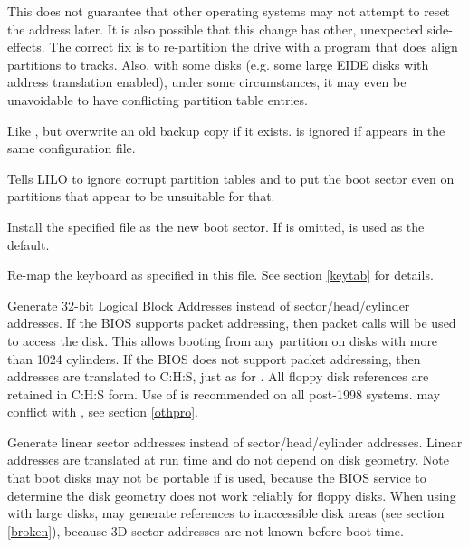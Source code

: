 \begin{description}
     This does not guarantee that other operating systems
    may not attempt to reset the address later. It is also possible that this
    change has other, unexpected side-effects. The correct fix is to
    re-partition the drive with a program that does align partitions to tracks.
    Also, with some disks (e.g. some large EIDE disks with address
    translation enabled), under some circumstances, it may even be unavoidable
    to have conflicting partition table entries.
  \item[\craw{force-backup=}\meta{backup\_file}] Like , but
    overwrite an old backup copy if it exists.
    is ignored if  appears in the same configuration file.
  \item[\craw{ignore-table}] Tells LILO to ignore corrupt partition tables and
    to put the boot sector even on partitions that appear to be unsuitable for
    that.
  \item[\craw{install=}\meta{boot\_sector}] Install the specified file as the
    new boot sector. If  is omitted,  is used
    as the default.
  \item[\craw{keytable=}\meta{table\_file}] Re-map the keyboard as specified
    in this file. See section \ref{keytab} for details.
  \item[\craw{lba32}] Generate 32-bit Logical Block Addresses instead of 
    sector/head/cylinder addresses. If the BIOS supports packet addressing, 
    then packet calls will be used to access the disk. This allows booting 
    from any partition on disks with more than 1024 cylinders. If the BIOS 
    does not support packet addressing, then  addresses are 
    translated to C:H:S, just as for . All floppy disk references 
    are retained in C:H:S form.  Use of  is recommended on all 
    post-1998 systems.
     may conflict with , see section \ref{othpro}.
  \item[\craw{linear}] Generate linear sector addresses instead of
    sector/head/cylinder addresses. Linear addresses are translated at run
    time and do not depend on disk geometry. Note that boot disks
    may not be portable if  is used,
    because the BIOS service to
    determine the disk geometry does not work reliably for floppy disks.
    When using  with large disks,  may
    generate references to inaccessible disk areas (see section \ref{broken}),
    because 3D sector addresses are not known before boot time.

\end{description}
